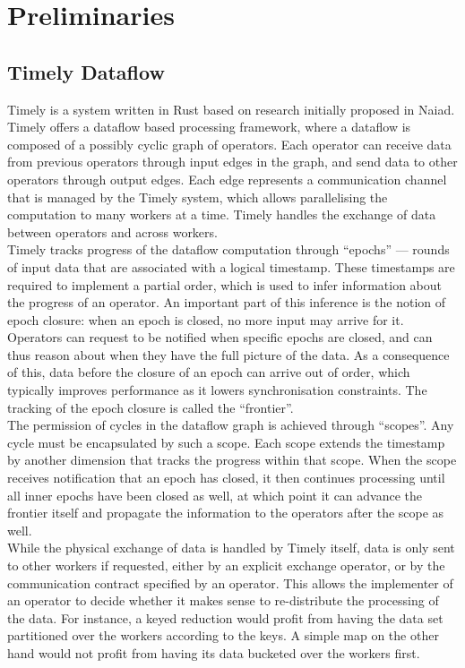 \section{Preliminaries}

\subsection{Timely Dataflow}
Timely\cite{timely} is a system written in Rust based on research initially proposed in Naiad\cite{naiad}. Timely offers a dataflow based processing framework, where a dataflow is composed of a possibly cyclic graph of operators. Each operator can receive data from previous operators through input edges in the graph, and send data to other operators through output edges. Each edge represents a communication channel that is managed by the Timely system, which allows parallelising the computation to many workers at a time. Timely handles the exchange of data between operators and across workers. \\

Timely tracks progress of the dataflow computation through ``epochs'' --- rounds of input data that are associated with a logical timestamp. These timestamps are required to implement a partial order, which is used to infer information about the progress of an operator. An important part of this inference is the notion of epoch closure: when an epoch is closed, no more input may arrive for it. Operators can request to be notified when specific epochs are closed, and can thus reason about when they have the full picture of the data. As a consequence of this, data before the closure of an epoch can arrive out of order, which typically improves performance as it lowers synchronisation constraints. The tracking of the epoch closure is called the ``frontier''. \\

The permission of cycles in the dataflow graph is achieved through ``scopes''. Any cycle must be encapsulated by such a scope. Each scope extends the timestamp by another dimension that tracks the progress within that scope. When the scope receives notification that an epoch has closed, it then continues processing until all inner epochs have been closed as well, at which point it can advance the frontier itself and propagate the information to the operators after the scope as well. \\

While the physical exchange of data is handled by Timely itself, data is only sent to other workers if requested, either by an explicit exchange operator, or by the communication contract specified by an operator. This allows the implementer of an operator to decide whether it makes sense to re-distribute the processing of the data. For instance, a keyed reduction would profit from having the data set partitioned over the workers according to the keys. A simple map on the other hand would not profit from having its data bucketed over the workers first.

